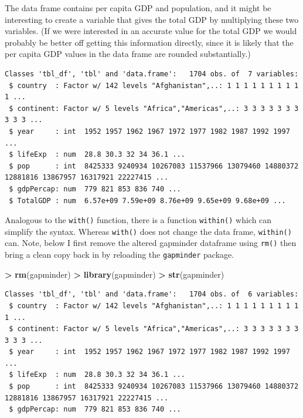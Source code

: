 \documentclass[]{krantz}
\makeatletter
\newenvironment{Shaded}{\begin{snugshade}}{\end{snugshade}}
\newcommand{\KeywordTok}[1]{\textcolor[rgb]{0.27,0.27,0.27}{\textbf{#1}}}
\newcommand{\StringTok}[1]{\textcolor[rgb]{0.5,0.5,0.5}{#1}}
\newcommand{\OperatorTok}[1]{\textcolor[rgb]{0.43,0.43,0.43}{\textbf{#1}}}
\newcommand{\NormalTok}[1]{#1}
\newenvironment{kframe}{%
\medskip{}
\setlength{\fboxsep}{.8em}
 \def\at@end@of@kframe{}%
 \ifinner\ifhmode%
  \def\at@end@of@kframe{\end{minipage}}%
  \begin{minipage}{\columnwidth}%
 \fi\fi%
 \def\FrameCommand##1{\hskip\@totalleftmargin \hskip-\fboxsep
 \colorbox{shadecolor}{##1}\hskip-\fboxsep
     \hskip-\linewidth \hskip-\@totalleftmargin \hskip\columnwidth}%
 \MakeFramed {\advance\hsize-\width
   \@totalleftmargin\z@ \linewidth\hsize
   \@setminipage}}%
 {\par\unskip\endMakeFramed%
 \at@end@of@kframe}
\renewenvironment{Shaded}{\begin{kframe}}{\end{kframe}}
\makeatother
\begin{document}
The data frame contains per capita GDP and population, and it might be
interesting to create a variable that gives the total GDP by multiplying
these two variables. (If we were interested in an accurate value for the
total GDP we would probably be better off getting this information
directly, since it is likely that the per capita GDP values in the data
frame are rounded substantially.)

\begin{Shaded}
\end{Shaded}

\begin{verbatim}
Classes 'tbl_df', 'tbl' and 'data.frame':   1704 obs. of  7 variables:
 $ country  : Factor w/ 142 levels "Afghanistan",..: 1 1 1 1 1 1 1 1 1 1 ...
 $ continent: Factor w/ 5 levels "Africa","Americas",..: 3 3 3 3 3 3 3 3 3 3 ...
 $ year     : int  1952 1957 1962 1967 1972 1977 1982 1987 1992 1997 ...
 $ lifeExp  : num  28.8 30.3 32 34 36.1 ...
 $ pop      : int  8425333 9240934 10267083 11537966 13079460 14880372 12881816 13867957 16317921 22227415 ...
 $ gdpPercap: num  779 821 853 836 740 ...
 $ TotalGDP : num  6.57e+09 7.59e+09 8.76e+09 9.65e+09 9.68e+09 ...
\end{verbatim}

Analogous to the \texttt{with()} function, there is a function
\texttt{within()} which can simplify the syntax. Whereas \texttt{with()}
does not change the data frame, \texttt{within()} can. Note, below I
first remove the altered gapminder dataframe using \texttt{rm()} then
bring a clean copy back in by reloading the \texttt{gapminder} package.

\begin{Shaded}
\begin{Highlighting}[]
\OperatorTok{>}\StringTok{ }\KeywordTok{rm}\NormalTok{(gapminder)}
\OperatorTok{>}\StringTok{ }\KeywordTok{library}\NormalTok{(gapminder)}
\OperatorTok{>}\StringTok{ }\KeywordTok{str}\NormalTok{(gapminder)}
\end{Highlighting}
\end{Shaded}

\begin{verbatim}
Classes 'tbl_df', 'tbl' and 'data.frame':   1704 obs. of  6 variables:
 $ country  : Factor w/ 142 levels "Afghanistan",..: 1 1 1 1 1 1 1 1 1 1 ...
 $ continent: Factor w/ 5 levels "Africa","Americas",..: 3 3 3 3 3 3 3 3 3 3 ...
 $ year     : int  1952 1957 1962 1967 1972 1977 1982 1987 1992 1997 ...
 $ lifeExp  : num  28.8 30.3 32 34 36.1 ...
 $ pop      : int  8425333 9240934 10267083 11537966 13079460 14880372 12881816 13867957 16317921 22227415 ...
 $ gdpPercap: num  779 821 853 836 740 ...
\end{verbatim}
\end{document}
